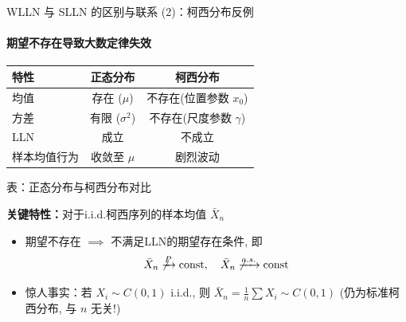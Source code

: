 \documentclass[UTF8]{beamer}
\begin{document}
\begin{frame}{WLLN 与 SLLN 的区别与联系 (2)：柯西分布反例}
    \framesubtitle{期望不存在导致大数定律失效}
 
    \centering
    \begin{tabular}{lcc}
        \toprule
        \textbf{特性} & \textbf{正态分布} & \textbf{柯西分布} \\
        \midrule
        均值 & 存在 ($\mu$) & 不存在(位置参数 $x_0$) \\
        \midrule
        方差 & 有限 ($\sigma^2$) & 不存在(尺度参数 $\gamma$) \\
        \midrule
        LLN & 成立 & 不成立  \\
        \midrule
        样本均值行为 & 收敛至 $\mu$ & 剧烈波动 \\
        \bottomrule
    \end{tabular}
    \vspace{0.5cm} %
    \par %
    \centering %
    \small %
    表：正态分布与柯西分布对比

    \pause
    \vspace{0.5cm}
    \leftskip=0.5cm

    \textbf{关键特性：}对于i.i.d.柯西序列的样本均值 $\bar{X}_n$
    \begin{itemize}
       \item 期望\alert{不存在} $\implies$ 不满足LLN的期望存在条件, 即
        \[ \bar{X}_n \not\xrightarrow{P} \text{const}, \quad \bar{X}_n \not\xrightarrow{a.s.} \text{const} \]
       \item \alert{惊人事实}：若 $X_i \sim C(0,1)$ i.i.d., 则 $\bar{X}_n = \frac{1}{n} \sum X_i \sim C(0,1)$ (\alert{仍为标准柯西分布}, 与 $n$ 无关!)
    \end{itemize}
    \vspace{0.3cm}
\end{frame}
\end{document}
